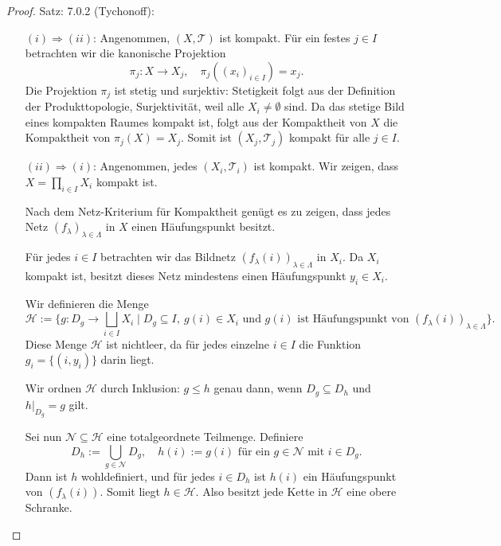 \begin{proof}{Satz: 7.0.2 (Tychonoff):}\\
    \begin{enumerate}
    \item[$(i) \Rightarrow (ii)$:] 
    Angenommen, $(X, \mathcal{T})$ ist kompakt. 
    Für ein festes $j \in I$ betrachten wir die kanonische Projektion
    $$
    \pi_j : X \to X_j, \quad \pi_j((x_i)_{i \in I}) = x_j.
    $$
    Die Projektion $\pi_j$ ist stetig und surjektiv: 
    Stetigkeit folgt aus der Definition der Produkttopologie, 
    Surjektivität, weil alle $X_i \neq \emptyset$ sind. 
    Da das stetige Bild eines kompakten Raumes kompakt ist, 
    folgt aus der Kompaktheit von $X$ die Kompaktheit von $\pi_j(X) = X_j$. 
    Somit ist $(X_j, \mathcal{T}_j)$ kompakt für alle $j \in I$.

    \item[$(ii) \Rightarrow (i)$:] 
    Angenommen, jedes $(X_i, \mathcal{T}_i)$ ist kompakt. 
    Wir zeigen, dass $X = \prod_{i \in I} X_i$ kompakt ist.

    Nach dem Netz-Kriterium für Kompaktheit genügt es zu zeigen, 
    dass jedes Netz $(f_\lambda)_{\lambda \in \Lambda}$ in $X$ 
    einen Häufungspunkt besitzt.

    Für jedes $i \in I$ betrachten wir das Bildnetz 
    $(f_\lambda(i))_{\lambda \in \Lambda}$ in $X_i$. 
    Da $X_i$ kompakt ist, besitzt dieses Netz mindestens einen Häufungspunkt $y_i \in X_i$. 

    Wir definieren die Menge
    $$
    \mathcal{H} := \{ g : D_g \to \bigsqcup_{i \in I} X_i \mid 
    D_g \subseteq I,\ g(i) \in X_i \text{ und } g(i) \text{ ist Häufungspunkt von } 
    (f_\lambda(i))_{\lambda \in \Lambda} \}.
    $$
    Diese Menge $\mathcal{H}$ ist nichtleer, 
    da für jedes einzelne $i \in I$ die Funktion $g_i = \{(i, y_i)\}$ darin liegt.

    Wir ordnen $\mathcal{H}$ durch Inklusion: 
    $g \le h$ genau dann, wenn $D_g \subseteq D_h$ und $h\vert_{D_g} = g$ gilt.

    Sei nun $\mathcal{N} \subseteq \mathcal{H}$ eine totalgeordnete Teilmenge. 
    Definiere 
    $$
    D_h := \bigcup_{g \in \mathcal{N}} D_g, 
    \quad h(i) := g(i) \text{ für ein } g \in \mathcal{N} \text{ mit } i \in D_g.
    $$
    Dann ist $h$ wohldefiniert, 
    und für jedes $i \in D_h$ ist $h(i)$ ein Häufungspunkt von $(f_\lambda(i))$. 
    Somit liegt $h \in \mathcal{H}$. 
    Also besitzt jede Kette in $\mathcal{H}$ eine obere Schranke. 


\end{enumerate}
\end{proof}
